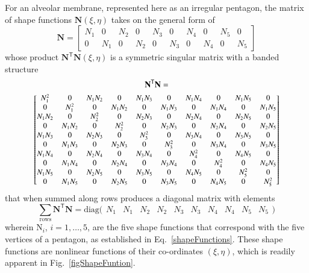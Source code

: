 For an alveolar membrane, represented here as an irregular pentagon, the matrix of shape functions $\mathbf{N}(\xi,\eta)$ takes on the general form of
\begin{equation}
\mathbf{N} = 
\begin{bmatrix}
N_1 & 0 & N_2 & 0 & N_3 & 0 & N_4 & 0 & N_5 & 0 \\ 
0 & N_1 & 0 & N_2 & 0 & N_3 & 0 & N_4 & 0 & N_5 
\end{bmatrix} 
\label{shape2D}
\end{equation}
whose product $\mathbf{N}^{\mathsf{T}}\mathbf{N}(\xi,\eta)$ is a symmetric singular matrix with a banded structure
\begin{multline}
     \mathbf{N}^{\mathsf{T}} \mathbf{N} = \\ \footnotesize \begin{bmatrix}
     N_1^2 & 0 & N_1 N_2 & 0 & N_1 N_3 & 0 & N_1 N_4 & 0 & N_1 N_5 & 0 \\
     0 & N_1^2 & 0 & N_1 N_2 & 0 & N_1 N_3 & 0 & N_1 N_4 & 0 & N_1 N_5 \\
     N_1 N_2 & 0 & N_2^2 & 0 & N_2 N_3 & 0 & N_2 N_4 & 0 & N_2 N_5 & 0 \\
     0 & N_1 N_2 & 0 & N_2^2 & 0 & N_2 N_3 & 0 & N_2 N_4 & 0 & N_2 N_5 \\
     N_1 N_3 & 0 & N_2 N_3 & 0 & N_3^2 & 0 & N_3 N_4 & 0 & N_3 N_5 & 0 \\
     0 & N_1 N_3 & 0 & N_2 N_3 & 0 & N_3^2 & 0 & N_3 N_4 & 0 & N_3 N_5 \\
     N_1 N_4 & 0 & N_2 N_4 & 0 & N_3 N_4 & 0 & N_4^2 & 0 & N_4 N_5 & 0 \\
     0 & N_1 N_4 & 0 & N_2 N_4 & 0 & N_3 N_4 & 0 & N_4^2 & 0 & N_4 N_5 \\
     N_1 N_5 & 0 & N_2 N_5 & 0 & N_3 N_5 & 0 & N_4 N_5 & 0 & N_5^2 & 0 \\
     0 & N_1 N_5 & 0 & N_2 N_5 & 0 & N_3 N_5 & 0 & N_4 N_5 & 0 & N_5^2
     \end{bmatrix}
\end{multline}
\normalsize
that when summed along rows produces a diagonal matrix with elements
\begin{equation}
    \sum_{\mathrm{rows}} \mathbf{N}^{\mathsf{T}} \mathbf{N} = 
    \mathrm{diag} \bigl( \begin{matrix}
    N_1 & N_1 & N_2 & N_2 & N_3 & N_3 & N_4 & N_4 & N_5 & N_5
    \end{matrix} \bigr)
\end{equation}
wherein $\mathrm{N}_i$, $i = 1, \ldots, 5$, are the five shape functions that correspond with the five vertices of a pentagon, as established in Eq.~\ref{shapeFunctions}.  These shape functions are nonlinear functions of their co-ordinates $(\xi,\eta)$, which is readily apparent in Fig.~\ref{figShapeFuntion}.

